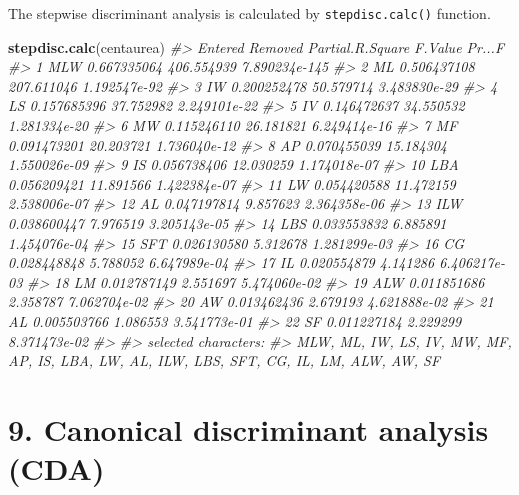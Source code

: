 \documentclass[
]{article}
\newenvironment{Shaded}{\begin{snugshade}}{\end{snugshade}}
\newcommand{\CommentTok}[1]{\textcolor[rgb]{0.56,0.35,0.01}{\textit{#1}}}
\newcommand{\KeywordTok}[1]{\textcolor[rgb]{0.13,0.29,0.53}{\textbf{#1}}}
\newcommand{\NormalTok}[1]{#1}
\begin{document}
The stepwise discriminant analysis is calculated by
\texttt{stepdisc.calc()} function.

\begin{Shaded}
\begin{Highlighting}[]
\KeywordTok{stepdisc.calc}\NormalTok{(centaurea)}
\CommentTok{#>    Entered Removed Partial.R.Square    F.Value        Pr...F}
\CommentTok{#> 1      MLW              0.667335064 406.554939 7.890234e-145}
\CommentTok{#> 2       ML              0.506437108 207.611046  1.192547e-92}
\CommentTok{#> 3       IW              0.200252478  50.579714  3.483830e-29}
\CommentTok{#> 4       LS              0.157685396  37.752982  2.249101e-22}
\CommentTok{#> 5       IV              0.146472637  34.550532  1.281334e-20}
\CommentTok{#> 6       MW              0.115246110  26.181821  6.249414e-16}
\CommentTok{#> 7       MF              0.091473201  20.203721  1.736040e-12}
\CommentTok{#> 8       AP              0.070455039  15.184304  1.550026e-09}
\CommentTok{#> 9       IS              0.056738406  12.030259  1.174018e-07}
\CommentTok{#> 10     LBA              0.056209421  11.891566  1.422384e-07}
\CommentTok{#> 11      LW              0.054420588  11.472159  2.538006e-07}
\CommentTok{#> 12      AL              0.047197814   9.857623  2.364358e-06}
\CommentTok{#> 13     ILW              0.038600447   7.976519  3.205143e-05}
\CommentTok{#> 14     LBS              0.033553832   6.885891  1.454076e-04}
\CommentTok{#> 15     SFT              0.026130580   5.312678  1.281299e-03}
\CommentTok{#> 16      CG              0.028448848   5.788052  6.647989e-04}
\CommentTok{#> 17      IL              0.020554879   4.141286  6.406217e-03}
\CommentTok{#> 18      LM              0.012787149   2.551697  5.474060e-02}
\CommentTok{#> 19     ALW              0.011851686   2.358787  7.062704e-02}
\CommentTok{#> 20      AW              0.013462436   2.679193  4.621888e-02}
\CommentTok{#> 21              AL      0.005503766   1.086553  3.541773e-01}
\CommentTok{#> 22      SF              0.011227184   2.229299  8.371473e-02}
\CommentTok{#> }
\CommentTok{#> selected characters:}
\CommentTok{#> MLW, ML, IW, LS, IV, MW, MF, AP, IS, LBA, LW, AL, ILW, LBS, SFT, CG, IL, LM, ALW, AW, SF}
\end{Highlighting}
\end{Shaded}

\hypertarget{canonical-discriminant-analysis-cda}{%
\section{9. Canonical discriminant analysis
(CDA)}\label{canonical-discriminant-analysis-cda}}
\end{document}
